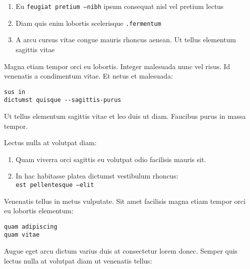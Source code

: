 \documentclass[9pt]{innovativeinnovation-cheatsheet}
\begin{document}
\begin{multicols*}{3}


\begin{enumerate}
  \item Eu \texttt{feugiat pretium --nibh}  ipsum consequat nisl vel pretium
        lectus
  \item Diam quis enim lobortis scelerisque \texttt{.fermentum}
  \item A arcu cursus vitae congue mauris rhoncus aenean. Ut tellus elementum
        sagittis vitae
\end{enumerate}


Magna etiam tempor orci eu lobortis. Integer malesuada nunc vel risus. Id
venenatis a condimentum vitae. Et netus et malesuada:

\begin{lstlisting}
sus in
dictumst quisque --sagittis-purus
\end{lstlisting}


Ut tellus elementum sagittis vitae et leo duis ut diam. Faucibus purus in
massa tempor.

Lectus nulla at volutpat diam:

\begin{enumerate}
  \item Quam viverra orci sagittis eu volutpat odio facilisis mauris sit.
  \item In hac habitasse platea dictumst vestibulum rhoncus:\\
    \texttt{est pellentesque --elit}
\end{enumerate}


Venenatis tellus in metus vulputate. Sit amet facilisis magna etiam tempor
orci eu lobortis elementum:

\begin{lstlisting}
quam adipiscing
quam vitae
\end{lstlisting}


Augue eget arcu dictum varius duis at consectetur lorem donec. Semper quis
lectus nulla at volutpat diam ut venenatis tellus:


\end{multicols*}
\end{document}
